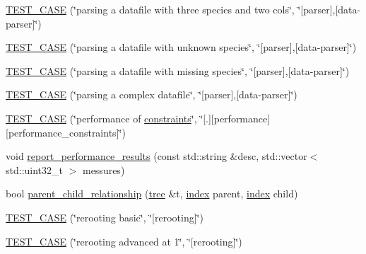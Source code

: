 \begin{DoxyCompactItemize}
\item 
\hyperlink{namespaceterraces_1_1tests_aab1e65aa0d41a834092ed422cc4cabe0}{T\+E\+S\+T\+\_\+\+C\+A\+SE} (\char`\"{}parsing a datafile with three species and two cols\char`\"{}, \char`\"{}\mbox{[}parser\mbox{]},\mbox{[}data-\/parser\mbox{]}\char`\"{})
\item 
\hyperlink{namespaceterraces_1_1tests_acdab43719774a5fed29e46e994f027ff}{T\+E\+S\+T\+\_\+\+C\+A\+SE} (\char`\"{}parsing a datafile with unknown species\char`\"{}, \char`\"{}\mbox{[}parser\mbox{]},\mbox{[}data-\/parser\mbox{]}\char`\"{})
\item 
\hyperlink{namespaceterraces_1_1tests_a0fabc77c663ac1a6f8267c9ad7b583e6}{T\+E\+S\+T\+\_\+\+C\+A\+SE} (\char`\"{}parsing a datafile with missing species\char`\"{}, \char`\"{}\mbox{[}parser\mbox{]},\mbox{[}data-\/parser\mbox{]}\char`\"{})
\item 
\hyperlink{namespaceterraces_1_1tests_a946b3521e68709d5223cf99e3152950b}{T\+E\+S\+T\+\_\+\+C\+A\+SE} (\char`\"{}parsing a complex datafile\char`\"{}, \char`\"{}\mbox{[}parser\mbox{]},\mbox{[}data-\/parser\mbox{]}\char`\"{})
\item 
\hyperlink{namespaceterraces_1_1tests_a2bd6b31f702a973b3ad04d3eb4f090a9}{T\+E\+S\+T\+\_\+\+C\+A\+SE} (\char`\"{}performance of \hyperlink{namespaceterraces_a6f603ffd30ed4d902fce6424492e0581}{constraints}\char`\"{}, \char`\"{}\mbox{[}.\mbox{]}\mbox{[}performance\mbox{]}\mbox{[}performance\+\_\+constraints\mbox{]}\char`\"{})
\item 
void \hyperlink{namespaceterraces_1_1tests_a62c2bedb73f6a77050e4efc1ae854e78}{report\+\_\+performance\+\_\+results} (const std\+::string \&desc, std\+::vector$<$ std\+::uint32\+\_\+t $>$ messures)
\item 
bool \hyperlink{namespaceterraces_1_1tests_a25ca9a3b46fb14ea14a41a5b863fc77a}{parent\+\_\+child\+\_\+relationship} (\hyperlink{namespaceterraces_a07aaf7feec4a22c6cdefc14c5a81bdd0}{tree} \&t, \hyperlink{namespaceterraces_adbc33ccb543d1634e96d0eb02e472c77}{index} parent, \hyperlink{namespaceterraces_adbc33ccb543d1634e96d0eb02e472c77}{index} child)
\item 
\hyperlink{namespaceterraces_1_1tests_af574704b1ebf76284d804ce56218664d}{T\+E\+S\+T\+\_\+\+C\+A\+SE} (\char`\"{}rerooting basic\char`\"{}, \char`\"{}\mbox{[}rerooting\mbox{]}\char`\"{})
\item 
\hyperlink{namespaceterraces_1_1tests_a37209663932916d39e3cb8610b57a87f}{T\+E\+S\+T\+\_\+\+C\+A\+SE} (\char`\"{}rerooting advanced at 1\char`\"{}, \char`\"{}\mbox{[}rerooting\mbox{]}\char`\"{})

\end{DoxyCompactItemize}

